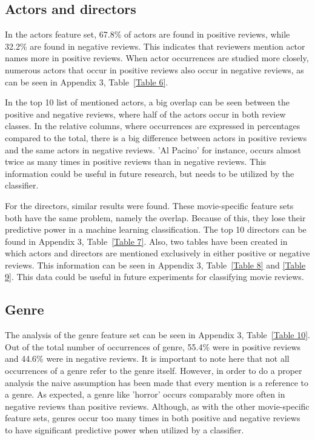 \documentclass[
10pt, %
a4paper, %
oneside, %
headinclude,footinclude, %
] {book}%
\begin{document}
\subsection{Actors and directors}

In the actors feature set, 67.8\% of actors are found in positive reviews, while 32.2\% are found in negative reviews. This indicates that reviewers mention actor names more in positive reviews. When actor occurrences are studied more closely, numerous actors that occur in positive reviews also occur in negative reviews, as can be seen in Appendix 3, Table~\ref{Table 6}. 

In the top 10 list of mentioned actors, a big overlap can be seen between the positive and negative reviews, where half of the actors occur in both review classes. In the relative columns, where occurrences are expressed in percentages compared to the total, there is a big difference between actors in positive reviews and the same actors in negative reviews. 'Al Pacino' for instance, occurs almost twice as many times in positive reviews than in negative reviews. This information could be useful in future research, but needs to be utilized by the classifier.

For the directors, similar results were found. These movie-specific feature sets both have the same problem, namely the overlap. Because of this, they lose their predictive power in a machine learning classification. The top 10 directors can be found in Appendix 3, Table~\ref{Table 7}. Also, two tables have been created in which actors and directors are mentioned exclusively in either positive or negative reviews. This information can be seen in Appendix 3, Table~\ref{Table 8} and \ref{Table 9}. This data could be useful in future experiments for classifying movie reviews. 

\subsection{Genre}

The analysis of the genre feature set can be seen in Appendix 3, Table~\ref{Table 10}. Out of the total number of occurrences of genre, 55.4\% were in positive reviews and 44.6\% were in negative reviews. It is important to note here that not all occurrences of a genre refer to the genre itself. However, in order to do a proper analysis the naive assumption has been made that every mention is a reference to a genre. As expected, a genre like 'horror' occurs comparably more often in negative reviews than positive reviews. Although, as with the other movie-specific feature sets, genres occur too many times in both positive and negative reviews to have significant predictive power when utilized by a classifier.
\end{document}
